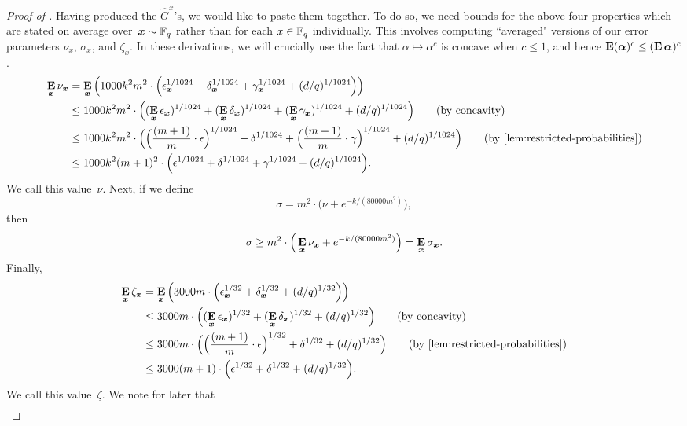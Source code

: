\begin{proof}[Proof of ]
Having produced the $\widehat{G}^x$'s, we would like to paste them together.
To do so, we need bounds for the above four properties
which are stated on average over~${\boldsymbol{x}} \sim \mathbb F_q$ rather than for each $x \in \mathbb F_q$ individually.
This involves computing ``averaged" versions of our error parameters  $\nu_x$, $\sigma_x$, and $\zeta_x$.
In these derivations, we will crucially use the fact that $\alpha \mapsto \alpha^c$ is concave when $c \leq 1$,
and hence $\mathop{\bf E\/} (\boldsymbol{\alpha})^c \leq (\mathop{\bf E\/} \boldsymbol{\alpha})^c$.
\begin{align*}
\E_{\bx} \nu_{\bx}
& = \E_{\bx}\Big(1000k^2 m^2 \cdot\Big(\eps_{\bx}^{1/1024} + \delta_{\bx}^{1/1024} + \gamma_{\bx}^{1/1024} + (d/q)^{1/1024}\Big)\Big)\\
& \leq1000k^2 m^2 \cdot\Big((\E_{\bx}\eps_{\bx})^{1/1024} + (\E_{\bx} \delta_{\bx})^{1/1024} + (\E_{\bx}\gamma_{\bx})^{1/1024} + (d/q)^{1/1024}\Big)\tag{by concavity}\\
&\leq1000k^2 m^2 \cdot\Big(\Big(\frac{(m+1)}{m} \cdot \eps\Big)^{1/1024} + \delta^{1/1024} + \Big(\frac{(m+1)}{m} \cdot \gamma\Big)^{1/1024} + (d/q)^{1/1024}\Big) \tag{by \Cref{lem:restricted-probabilities}}\\ 
&\leq 1000k^2 (m+1)^2 \cdot\Big(\eps^{1/1024} + \delta^{1/1024} + \gamma^{1/1024} + (d/q)^{1/1024}\Big).
\end{align*}
We call this value~$\nu$.
Next, if we define
\begin{equation*}
\sigma = m^2 \cdot\Big(\nu + e^{- k/(80000m^2)}\Big),
\end{equation*}
then
\begin{equation*}
\sigma \geq m^2 \cdot\Big(\mathop{\bf E\/}_{{\boldsymbol{x}}} \nu_{{\boldsymbol{x}}} + e^{- k/(80000m^2)}\Big)
	= \mathop{\bf E\/}_{{\boldsymbol{x}}} \sigma_{{\boldsymbol{x}}}.
\end{equation*}
Finally,
\begin{align*}
\E_{\bx} \zeta_{\bx}
& = \E_{\bx} \Big(3000m \cdot \Big(\eps_{\bx}^{1/32} + \delta_{\bx}^{1/32} + (d/q)^{1/32}\Big)\Big)\\
& \leq 3000m \cdot \Big((\E_{\bx}\eps_{\bx})^{1/32} + (\E_{\bx} \delta_{\bx})^{1/32} + (d/q)^{1/32}\Big)
	\tag{by concavity}\\
&\leq 3000 m \cdot \Big(\Big( \frac{(m+1)}{m} \cdot \eps\Big)^{1/32} + \delta^{1/32} + (d/q)^{1/32}\Big)
	\tag{by \Cref{lem:restricted-probabilities}}\\
&\leq3000 (m+1) \cdot \Big(\eps^{1/32} + \delta^{1/32} + (d/q)^{1/32}\Big).
\end{align*}
We call this value~$\zeta$.
We note for later that
\begin{align}

\end{align}
\end{proof}
